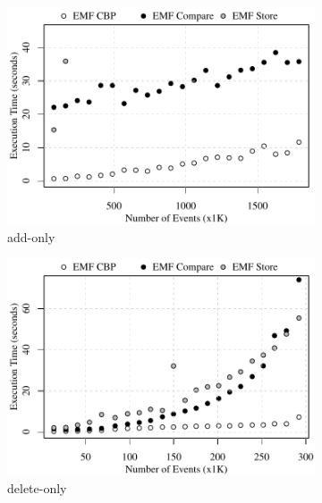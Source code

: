 \begin{figure}[ht]
\centering
\begin{subfigure}[t]{0.490\linewidth}
	\includegraphics[width=\linewidth]{add-conflict-time-events}
	\caption{add-only}
	\label{fig:add-conflict-time-events}
\end{subfigure}
\hfill
\begin{subfigure}[t]{0.490\linewidth}
	\includegraphics[width=\linewidth]{delete-conflict-time-events}
	\caption{delete-only}
	\label{fig:delete-conflict-time-events}
\end{subfigure}
\\
\begin{subfigure}[t]{0.490\linewidth}

\end{subfigure}
\end{figure}
